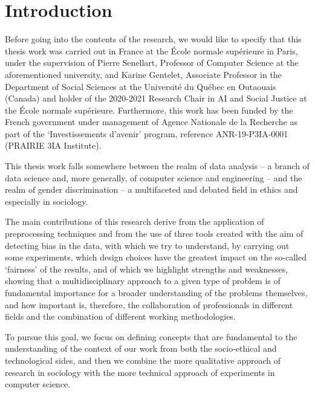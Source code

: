 \chapter{Introduction}
\label{chapter:introduction}
\thispagestyle{empty}

Before going into the contents of the research, we would like to specify that this thesis work was carried out in France at the \'Ecole normale sup\'erieure in Paris, under the supervision of Pierre Senellart, Professor of Computer Science at the aforementioned university, and Karine Gentelet, Associate Professor in the Department of Social Sciences at the Universit\'e du Qu\'ebec en Outaouais (Canada) and holder of the 2020-2021 Research Chair in AI and Social Justice at the \'Ecole normale sup\'erieure. Furthermore, this work has been funded by the French government under management of Agence Nationale de la Recherche as part of the `Investissements d'avenir' program, reference ANR-19-P3IA-0001
(PRAIRIE 3IA Institute).

This thesis work falls somewhere between the realm of data analysis -- a branch of data science and, more generally, of computer science and engineering -- and the realm of gender discrimination -- a multifaceted and debated field in ethics and especially in sociology.

The main contributions of this research derive from the application of preprocessing techniques and from the use of three tools created with the aim of detecting bias in the data, with which we try to understand, by carrying out some experiments, which design choices have the greatest impact on the so-called `fairness' of the results, and of which we highlight strengths and weaknesses, showing that a multidisciplinary approach to a given type of problem is of fundamental importance for a broader understanding of the problems themselves, and how important is, therefore, the collaboration of professionals in different fields and the combination of different working methodologies.

To pursue this goal, we focus on defining concepts that are fundamental to the understanding of the context of our work from both the socio-ethical and technological sides, and then we combine the more qualitative approach of research in sociology with the more technical approach of experiments in computer science.


